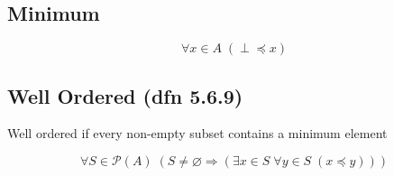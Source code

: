 \documentclass[12pt]{article}
\begin{document}
\begin{spacing}{1.5}
\subsection{Minimum}

$$\forall x \in A \; (\perp \preceq x)$$

\subsection{Well Ordered (dfn 5.6.9)}

Well ordered if every non-empty subset contains a minimum element

$$\forall S \in \mathcal{P}(A) \; (S \neq \varnothing \Rightarrow (\exists x \in S \; \forall y \in S \; (x \preceq y)))$$

\end{spacing}
\end{document}

